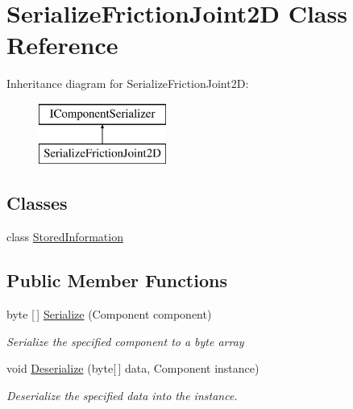 \hypertarget{class_serialize_friction_joint2_d}{}\section{Serialize\+Friction\+Joint2D Class Reference}
\label{class_serialize_friction_joint2_d}
Inheritance diagram for Serialize\+Friction\+Joint2D\+:\begin{figure}[H]
\begin{center}
\leavevmode
\includegraphics[height=2.000000cm]{class_serialize_friction_joint2_d}
\end{center}
\end{figure}
\subsection*{Classes}
\begin{DoxyCompactItemize}
\item 
class \hyperlink{class_serialize_friction_joint2_d_1_1_stored_information}{Stored\+Information}
\end{DoxyCompactItemize}
\subsection*{Public Member Functions}
\begin{DoxyCompactItemize}
\item 
byte \mbox{[}$\,$\mbox{]} \hyperlink{class_serialize_friction_joint2_d_a6063f9c73da7ddac92e9da48628f17c1}{Serialize} (Component component)
\begin{DoxyCompactList}\small\item\em Serialize the specified component to a byte array \end{DoxyCompactList}\item 
void \hyperlink{class_serialize_friction_joint2_d_a54d659c051702c28e03ab1d9cb938605}{Deserialize} (byte\mbox{[}$\,$\mbox{]} data, Component instance)
\begin{DoxyCompactList}\small\item\em Deserialize the specified data into the instance. \end{DoxyCompactList}\end{DoxyCompactItemize}


